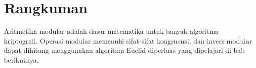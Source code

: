 \section*{Rangkuman}
Aritmetika modular adalah dasar matematika untuk banyak algoritma kriptografi. Operasi modular memenuhi sifat-sifat kongruensi, dan invers modular dapat dihitung menggunakan algoritma Euclid diperluas yang dipelajari di bab berikutnya.
